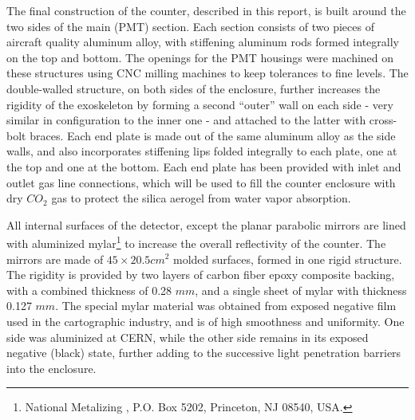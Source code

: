 {The final construction of the counter, described in this report, is built
around the two sides of the main (PMT) section. Each section consists of two pieces
of aircraft quality aluminum alloy, with stiffening aluminum rods formed
integrally on the top and bottom.  
The openings for the PMT housings were machined on these structures using CNC 
milling machines to keep tolerances to fine levels.  
The double-walled structure, on both sides of the enclosure, further increases 
the rigidity of the exoskeleton by forming a second ``outer'' wall on each side 
- very similar in configuration to the inner one - and attached to the latter with 
cross-bolt braces.
Each end plate is made out of the same aluminum alloy as the side walls, and
also incorporates stiffening lips folded integrally to each plate, one at the
top and one at the bottom.  Each end plate has been provided with inlet and
outlet gas line connections, which will be used to fill the counter enclosure
with dry $CO_2$ gas to protect the silica aerogel from water vapor absorption.

All internal surfaces of the detector, except the planar parabolic mirrors
are lined with aluminized 
mylar\footnote{National Metalizing , P.O. Box 5202, Princeton, NJ 08540, USA.} 
to increase the overall reflectivity of the counter.  
The mirrors are made of $45\times 20.5 cm^2$ molded surfaces, formed in one 
rigid structure. 
The rigidity is provided by two layers of carbon fiber epoxy composite backing, 
with a combined thickness of 0.28 $mm$, and a single sheet of mylar with 
thickness 0.127 $mm$. 
The special mylar material was obtained from exposed negative film used in the
cartographic industry, and is of high smoothness and uniformity. One side was
aluminized at CERN, while the other side remains in its exposed negative
(black) state, further adding to the successive light penetration barriers into
the enclosure.  
 
}
